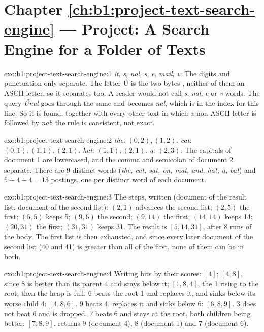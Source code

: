 \section*{Chapter \ref{ch:b1:project-text-search-engine} --- Project: A Search Engine for a Folder of Texts}

\begin{solution}{exo:b1:project-text-search-engine:1}
\emph{it}, \emph{s}, \emph{nal}, \emph{s}, \emph{e}, \emph{mail}, \emph{v}. The digits and punctuation only separate.
The letter Ü is the two bytes , neither of them an ASCII letter, so it separates too. A reader would not
call \emph{s}, \emph{nal}, \emph{e} or \emph{v} words. The query \emph{Ünal} goes through the same  and becomes
\emph{nal}, which is in the index for this line. So it is found, together with every other text in which a non-ASCII
letter is followed by \emph{nal}: the rule is consistent, not exact.
\end{solution}

\begin{solution}{exo:b1:project-text-search-engine:2}
\emph{the}: $(0, 2), (1, 2)$. \emph{cat}: $(0, 1), (1, 1), (2, 1)$. \emph{hat}: $(1, 1), (2, 1)$. \emph{a}: $(2, 3)$.
The capitals of document 1 are lowercased, and the comma and semicolon of document 2 separate. There are 9 distinct
words (\emph{the, cat, sat, on, mat, and, hat, a, bat}) and $5 + 4 + 4 = 13$ postings, one per distinct word of each
document.
\end{solution}

\begin{solution}{exo:b1:project-text-search-engine:3}
The steps, written (document of the result list, document of the second list): $(2, 1)$ advances the second list;
$(2, 5)$ the first; $(5, 5)$ keeps 5; $(9, 6)$ the second; $(9, 14)$ the first; $(14, 14)$ keeps 14; $(20, 31)$ the
first; $(31, 31)$ keeps 31. The result is $[5, 14, 31]$, after 8 runs of the body. The first list is then exhausted,
and since every later document of the second list (40 and 41) is greater than all of the first, none of them can be
in both.
\end{solution}

\begin{solution}{exo:b1:project-text-search-engine:4}
Writing hits by their scores: $[4]$; $[4, 8]$, since 8 is better than its parent 4 and stays below it; $[1, 8, 4]$, the
1 rising to the root; then the heap is full. 6 beats the root 1 and replaces it, and sinks below its worse child 4:
$[4, 8, 6]$. 9 beats 4, replaces it and sinks below 6: $[6, 8, 9]$. 3 does not beat 6 and is dropped. 7 beats 6 and
stays at the root, both children being better: $[7, 8, 9]$.  returns 9 (document 4), 8 (document 1)
and 7 (document 6).
\end{solution}


